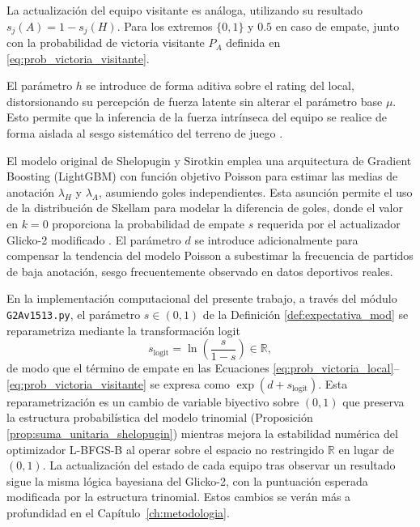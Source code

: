 La actualización del equipo visitante es análoga, utilizando su resultado $s_j(A)=1-s_j(H)$.  Para los extremos $\{0,1\}$ y $0.5$  en caso de empate, junto con la probabilidad de victoria visitante $P_A$ definida en \eqref{eq:prob_victoria_visitante}.

\begin{obs}
	El par\'ametro $h$ se introduce de forma aditiva sobre el rating del local, distorsionando su percepci\'on de fuerza latente sin alterar el par\'ametro base $\mu$. Esto permite que la inferencia de la fuerza intr\'inseca del equipo se realice de forma aislada al sesgo sistem\'atico del terreno de juego \cite{Glicko2Mod}.
\end{obs}

\begin{obs}
	\label{obs:lightgbm_vs_loglineal}
	El modelo original de Shelopugin y Sirotkin emplea una arquitectura de Gradient Boosting (LightGBM) con funci\'on objetivo Poisson para estimar las medias de anotaci\'on $\lambda_H$ y $\lambda_A$, asumiendo goles independientes. Esta asunci\'on permite el uso de la distribuci\'on de Skellam para modelar la diferencia de goles, donde el valor en $k=0$ proporciona la probabilidad de empate $s$ requerida por el actualizador Glicko-2 modificado \cite{Glicko2Mod}. El par\'ametro $d$ se introduce adicionalmente para compensar la tendencia del modelo Poisson a subestimar la frecuencia de partidos de baja anotaci\'on, sesgo frecuentemente observado en datos deportivos reales.
	
\end{obs}


En la implementaci\'on computacional del presente trabajo, a trav\'es del m\'odulo \texttt{G2Av1513.py}, el par\'ametro $s\in(0,1)$ de la Definici\'on \ref{def:expectativa_mod} se reparametriza mediante la transformaci\'on logit
\begin{equation}
	\label{eq:logit_pd}
	s_\text{logit}  = \ln\!\left(\frac{s}{1-s}\right) \in \mathbb{R},
\end{equation}
de modo que el t\'ermino de empate en las Ecuaciones \eqref{eq:prob_victoria_local}--\eqref{eq:prob_victoria_visitante} se expresa como $\exp(d + s_\text{logit})$. Esta reparametrizaci\'on es un cambio de variable biyectivo sobre $(0,1)$ que preserva la estructura probabil\'istica del modelo trinomial (Proposici\'on \ref{prop:suma_unitaria_shelopugin}) mientras mejora la estabilidad num\'erica del optimizador L-BFGS-B al operar sobre el espacio no restringido $\mathbb{R}$ en lugar de $(0,1)$. La actualizaci\'on del estado de cada equipo tras observar un resultado sigue la misma l\'ogica bayesiana del Glicko-2, con la puntuaci\'on esperada modificada por la estructura trinomial. Estos cambios se ver\'an m\'as a profundidad en el Cap\'itulo~\ref{ch:metodologia}.


